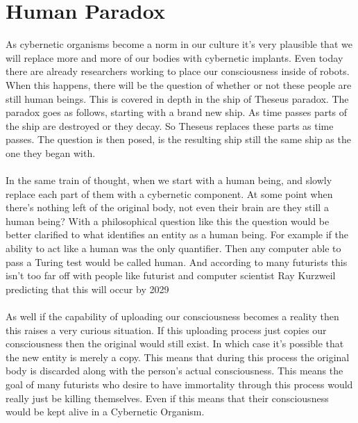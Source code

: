 \documentclass[12pt,a4paper,notitlepage]{article}
\begin{document}
\section{Human Paradox}
As cybernetic organisms become a norm in our culture it's very plausible that we
will replace more and more of our bodies with cybernetic implants. Even today
there are already researchers working to place our consciousness inside of
robots. When this happens, there will be the question of whether or not these
people are still human beings. This is covered in depth in the ship of Theseus
paradox\cite{Theseus}. The paradox goes as follows, starting with a brand new
ship. As time passes parts of the ship are destroyed or they decay. So Theseus
replaces these parts as time passes. The question is then posed, is the
resulting ship still the same ship as the one they began with. 
\\\\
In the same train of thought, when we start with a human being, and slowly
replace each part of them with a cybernetic component. At some point when
there's nothing left of the original body, not even their brain are they still a
human being? With a philosophical question like this the question would be
better clarified to what identifies an entity as a human being. For example if
the ability to act like a human was the only quantifier. Then any computer able
to pass a Turing test would be called human. And according to many futurists
this isn't too far off with people like futurist and computer scientist Ray
Kurzweil predicting that this will occur by 2029\cite{Kurzweil}
\\\\
As well if the capability of uploading our consciousness becomes a reality then
this raises a very curious situation. If this uploading process just copies our
consciousness then the original would still exist. In which case it's possible
that the new entity is merely a copy. This means that during this process the
original body is discarded along with the person's actual consciousness. This
means the goal of many futurists who desire to have immortality through this
process would really just be killing themselves. Even if this means that their
consciousness would be kept alive in a Cybernetic Organism.
\end{document}
